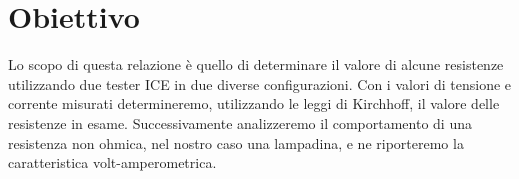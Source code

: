 \section{Obiettivo}

Lo scopo di questa relazione è quello di determinare il valore di alcune resistenze utilizzando due tester ICE in due diverse configurazioni. Con i valori di tensione e corrente misurati determineremo, utilizzando le leggi di Kirchhoff, il valore delle resistenze in esame.
Successivamente analizzeremo il comportamento di una resistenza non ohmica, nel nostro caso una lampadina, e ne riporteremo la caratteristica volt-amperometrica.
